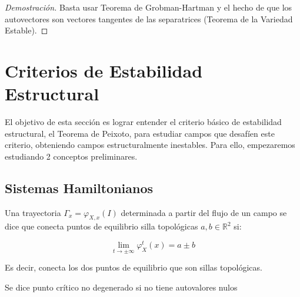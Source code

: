 \begin{proof}[Demostración]
	Basta usar Teorema de Grobman-Hartman y el hecho de que los autovectores son vectores tangentes de las separatrices (Teorema de la Variedad Estable).
\end{proof}


\section{Criterios de Estabilidad Estructural}

El objetivo de esta sección es lograr entender el criterio básico de estabilidad estructural, el Teorema de Peixoto, para estudiar campos que desafíen este criterio, obteniendo campos estructuralmente inestables. Para ello, empezaremos estudiando 2 conceptos preliminares.

\subsection{Sistemas Hamiltonianos}

\begin{defn}
	
\end{defn}

\begin{thm}
	
\end{thm}

\begin{thm}
	
\end{thm}

\begin{defn}
	Una trayectoria $\Gamma_x = \varphi_{X,x}(I)$ determinada a partir del flujo de un campo se dice que conecta puntos de equilibrio silla topológicas $a,b \in \mathbb{R}^2$ si:
	
	\begin{equation*}
		\lim_{t\to \pm \infty }\varphi_X^t(x) = a \pm b
	\end{equation*}
	
	Es decir, conecta los dos puntos de equilibrio que son sillas topológicas.
\end{defn}

\begin{defn}
	Se dice punto crítico no degenerado si no tiene autovalores nulos
\end{defn}

